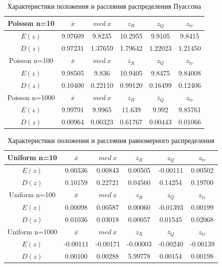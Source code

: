 \begin{table}[H]
	\begin{center}
		\begin{tabular}{|c||c|c|c|c|c|}
			\hline
			Poisson n=10 & $\overline{x} $ & $med\:x$ & $z_{R}$ & $z_{Q}$ & $z_{tr}$ \\
			\hline\hline
			$E(z)$ & 9.97609 &9.8235 & 10.2955 & 9.9105 &  9.8415  \\
			\hline
			$D(z)$ &0.97231  &1.37659 &1.79642 & 1.22023 & 1.21450 \\
			\hline\hline
			Poisson n=100 & $\overline{x} $ & $med\:x$ & $z_{R}$ & $z_{Q}$ & $z_{tr}$ \\
			\hline\hline
			$E(z)$ & 9.98505 & 9.836 & 10.9405  & 9.8475 & 9.84008 \\
			\hline
			$D(z)$ & 0.10400 & 0.22110 & 0.99120  & 0.16499 & 0.12406 \\
			\hline\hline
			Poisson n=1000 & $\overline{x} $ & $med\:x$ & $z_{R}$ & $z_{Q}$ & $z_{tr}$ \\
			\hline\hline
			$E(z)$ & 9.99791 & 9.9965 & 11.639 & 9.992  & 9.85761 \\
			\hline
			$D(z)$ &  0.00964 & 0.00323 & 0.61767 & 0.00443 & 0.01066 \\
			\hline
		\end{tabular}
	\end{center}
	\caption{Характеристики положения и рассеяния распределения Пуассона}
\end{table} 

\begin{table}[H]
	\begin{center}
		\begin{tabular}{|c||c|c|c|c|c|}
			\hline
			Uniform n=10 & $\overline{x} $ & $med\:x$ & $z_{R}$ & $z_{Q}$ & $z_{tr}$ \\
			\hline\hline
			$E(z)$ & 0.00336 &0.00843 & 0.00505 & -0.00111 & 0.00502 \\
			\hline
			$D(z)$ & 0.10159  & 0.22721 & 0.04560 & 0.14254 & 0.19700 \\
			\hline\hline
			Uniform n=100 & $\overline{x} $ & $med\:x$ & $z_{R}$ & $z_{Q}$ & $z_{tr}$ \\
			\hline\hline
			$E(z)$ & 0.00098 & 0.00587 & 0.00060 & -0.01393 &  0.00199\\
			\hline
			$D(z)$ & 0.01036 & 0.03018 & 0.00057 & 0.01545 & 0.02068  \\
			\hline\hline
			Uniform n=1000 & $\overline{x} $ & $med\:x$ & $z_{R}$ & $z_{Q}$ & $z_{tr}$ \\
			\hline\hline
			$E(z)$ & -0.00111 &-0.00171 & -0.00003 & -0.00240 & -0.00139  \\
			\hline
			$D(z)$ & 0.00100 & 0.00288 & 5.99778 & 0.00154 & 0.00198 \\
			\hline
		\end{tabular}
	\end{center}
	\caption{Характеристики положения и рассеяния равномерного распределения}
\end{table} 

